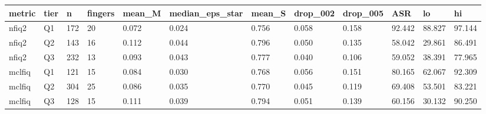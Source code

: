 \begin{tabular}{llllllllllll}
\hline
metric & tier & n & fingers & mean\_M & median\_eps\_star & mean\_S & drop\_002 & drop\_005 & ASR & lo & hi \\
\hline
nfiq2 & Q1 & 172 & 20 & 0.072 & 0.024 & 0.756 & 0.058 & 0.158 & 92.442 & 88.827 & 97.144 \\
nfiq2 & Q2 & 143 & 16 & 0.112 & 0.044 & 0.796 & 0.050 & 0.135 & 58.042 & 29.861 & 86.491 \\
nfiq2 & Q3 & 232 & 13 & 0.093 & 0.043 & 0.777 & 0.040 & 0.106 & 59.052 & 38.391 & 77.965 \\
mclfiq & Q1 & 121 & 15 & 0.084 & 0.030 & 0.768 & 0.056 & 0.151 & 80.165 & 62.067 & 92.309 \\
mclfiq & Q2 & 304 & 25 & 0.086 & 0.035 & 0.770 & 0.045 & 0.119 & 69.408 & 53.501 & 83.221 \\
mclfiq & Q3 & 128 & 15 & 0.111 & 0.039 & 0.794 & 0.051 & 0.139 & 60.156 & 30.132 & 90.250 \\
\hline
\end{tabular}
